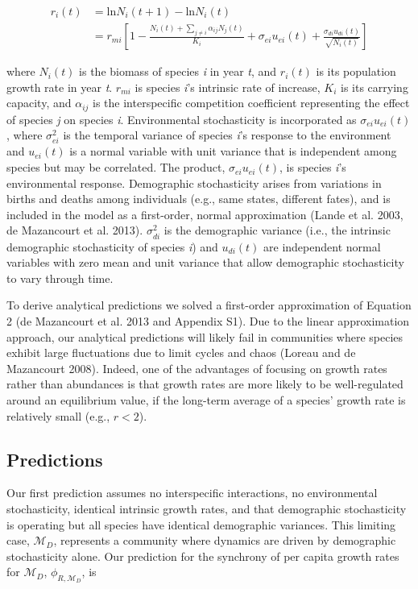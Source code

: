 \documentclass[12pt,]{article}
\begin{document}
\begin{align}
r_i(t) &= \text{ln}N_i(t+1) - \text{ln}N_i(t) \\
&= r_{mi} \left[ 1- \frac{N_i(t)+\sum_{j \neq i} \alpha_{ij}N_j(t)} {K_i} + \sigma_{ei}u_{ei}(t) + \frac{\sigma_{di}u_{di}(t)}{\sqrt{N_i(t)}} \right]
\end{align}

\noindent where \(N_i(t)\) is the biomass of species \emph{i} in year
\emph{t}, and \(r_i(t)\) is its population growth rate in year \emph{t}.
\(r_{mi}\) is species \emph{i}'s intrinsic rate of increase, \(K_i\) is
its carrying capacity, and \(\alpha_{ij}\) is the interspecific
competition coefficient representing the effect of species \emph{j} on
species \emph{i}. Environmental stochasticity is incorporated as
\(\sigma_{ei}u_{ei}(t)\), where \(\sigma_{ei}^2\) is the
temporal variance of species \emph{i}'s response to the environment and $u_{ei}(t)$ is a normal variable with unit variance that is independent among species but may be correlated.
The product, $\sigma_{ei}u_{ei}(t)$, is species \emph{i}'s environmental response.
Demographic stochasticity arises from variations in births and deaths
among individuals (e.g., same states, different fates), and is included
in the model as a first-order, normal approximation (Lande et al. 2003,
{{de Mazancourt}} et al. 2013). \(\sigma_{di}^2\) is the demographic
variance
(i.e., the intrinsic demographic stochasticity of species \emph{i})
and \(u_{di}(t)\) are independent normal variables with zero mean and
unit variance that allow demographic stochasticity to vary through time.

To derive analytical predictions we solved a first-order approximation
of Equation 2 ({{de Mazancourt}} et al. 2013 and Appendix S1). Due to
the linear approximation approach, our analytical predictions will
likely fail in communities where species exhibit large fluctuations due
to limit cycles and chaos (Loreau and {{de Mazancourt}} 2008). Indeed,
one of the advantages of focusing on growth rates rather than abundances
is that growth rates are more likely to be well-regulated around an
equilibrium value, if the long-term average of a species' growth rate is
relatively small (e.g., \(r < 2\)).

\subsection{Predictions}

Our first prediction assumes no interspecific interactions, no
environmental stochasticity, identical intrinsic growth rates, and that
demographic stochasticity is operating but all species have identical
demographic variances. This limiting case, \(\mathcal{M}_{D}\),
represents a community where dynamics are driven by demographic
stochasticity alone. Our prediction for the synchrony of per capita
growth rates for \(\mathcal{M}_{D}\), \(\phi_{R,\mathcal{M}_{D}}\), is
\end{document}
